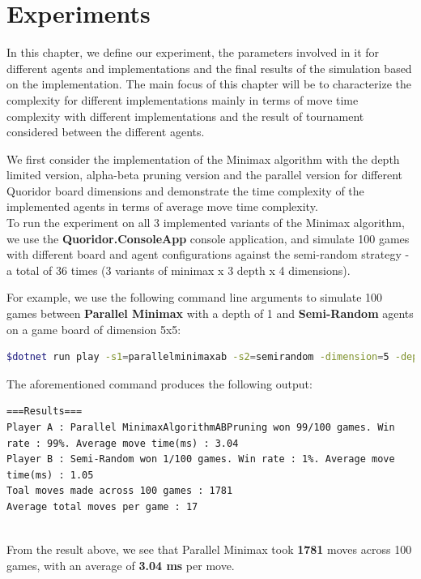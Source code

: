 \chapter{Experiments} \label{Experiments}

In this chapter, we define our experiment, the parameters involved in it for different agents and implementations and the final results of the simulation based on the implementation. The main focus of this chapter will be to characterize the complexity for different implementations mainly in terms of move time complexity with different implementations and the result of tournament considered between the different agents.

We first consider the implementation of the Minimax algorithm with the depth limited version, alpha-beta pruning version and the parallel version for different Quoridor board dimensions and demonstrate the time complexity of the implemented agents in terms of average move time complexity.\\
To run the experiment on all 3 implemented variants of the Minimax algorithm, we use the \textbf{Quoridor.ConsoleApp} console application, and simulate 100 games with different board and agent configurations against the semi-random strategy - a total of 36 times (3 variants of minimax x 3 depth x 4 dimensions).

For example, we use the following command line arguments to simulate 100 games between \textbf{Parallel Minimax} with a depth of 1 and \textbf{Semi-Random} agents on a game board of dimension 5x5:

\begin{lstlisting}[language=bash]
$dotnet run play -s1=parallelminimaxab -s2=semirandom -dimension=5 -depth=1 -sim -numsim=100
\end{lstlisting}

The aforementioned command produces the following output:

\begin{lstlisting}
===Results===
Player A : Parallel MinimaxAlgorithmABPruning won 99/100 games. Win rate : 99%. Average move time(ms) : 3.04
Player B : Semi-Random won 1/100 games. Win rate : 1%. Average move time(ms) : 1.05
Toal moves made across 100 games : 1781
Average total moves per game : 17
\end{lstlisting}
\\
From the result above, we see that Parallel Minimax took \textbf{1781} moves across 100 games, with an average of \textbf{3.04 ms} per move.

